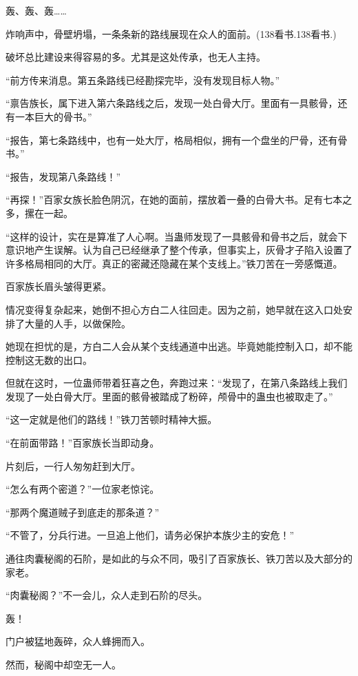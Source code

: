 
\begin{this_body}

轰、轰、轰……

炸响声中，骨壁坍塌，一条条新的路线展现在众人的面前。(138看书.138看书.)

破坏总比建设来得容易的多。尤其是这处传承，也无人主持。

“前方传来消息。第五条路线已经勘探完毕，没有发现目标人物。”

“禀告族长，属下进入第六条路线之后，发现一处白骨大厅。里面有一具骸骨，还有一本巨大的骨书。”

“报告，第七条路线中，也有一处大厅，格局相似，拥有一个盘坐的尸骨，还有骨书。”

“报告，发现第八条路线！”

“再探！”百家女族长脸色阴沉，在她的面前，摆放着一叠的白骨大书。足有七本之多，摞在一起。

“这样的设计，实在是算准了人心啊。当蛊师发现了一具骸骨和骨书之后，就会下意识地产生误解。认为自己已经继承了整个传承，但事实上，灰骨才子陷入设置了许多格局相同的大厅。真正的密藏还隐藏在某个支线上。”铁刀苦在一旁感慨道。

百家族长眉头皱得更紧。

情况变得复杂起来，她倒不担心方白二人往回走。因为之前，她早就在这入口处安排了大量的人手，以做保险。

她现在担忧的是，方白二人会从某个支线通道中出逃。毕竟她能控制入口，却不能控制这无数的出口。

但就在这时，一位蛊师带着狂喜之色，奔跑过来：“发现了，在第八条路线上我们发现了一处白骨大厅。里面的骸骨被踏成了粉碎，颅骨中的蛊虫也被取走了。”

“这一定就是他们的路线！”铁刀苦顿时精神大振。

“在前面带路！”百家族长当即动身。

片刻后，一行人匆匆赶到大厅。

“怎么有两个密道？”一位家老惊诧。

“那两个魔道贼子到底走的那条道？”

“不管了，分兵行进。一旦追上他们，请务必保护本族少主的安危！”

通往肉囊秘阁的石阶，是如此的与众不同，吸引了百家族长、铁刀苦以及大部分的家老。

“肉囊秘阁？”不一会儿，众人走到石阶的尽头。

轰！

门户被猛地轰碎，众人蜂拥而入。

然而，秘阁中却空无一人。


\end{this_body}
